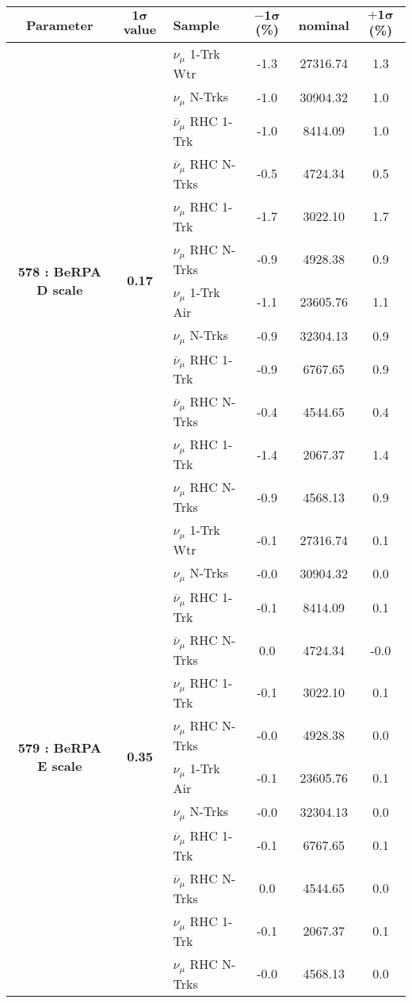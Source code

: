 \addtocounter{table}{-1}
\begin{table}[ht!]
\centering

\begin{tabular}{ c  c  l  c  c  c }
\midrule[1.3pt]
\textbf{Parameter} & \textbf{$\mathbf{1\sigma}$ value} & \textbf{Sample} & \textbf{$\mathbf{-1\sigma}$ (\%)}  &  \textbf{nominal}  &  \textbf{$\mathbf{+1\sigma}$ (\%)} \\
\midrule[1.3pt]
\multirow{12}{*}{\textbf{578 : BeRPA D scale}} & \multirow{12}{*}{\textbf{0.17}} & $\nu_\mu$ 1-Trk Wtr &   -1.3 &  27316.74 &   1.3 \\ 
 &  & $\nu_\mu$ N-Trks &   -1.0 &  30904.32 &   1.0 \\ 
 &  & $\overline{\nu}_\mu$ RHC 1-Trk &   -1.0 &  8414.09 &   1.0 \\ 
 &  & $\overline{\nu}_\mu$ RHC N-Trks &   -0.5 &  4724.34 &   0.5 \\ 
 &  & $\nu_\mu$ RHC 1-Trk &   -1.7 &  3022.10 &   1.7 \\ 
 &  & $\nu_\mu$ RHC N-Trks &   -0.9 &  4928.38 &   0.9 \\ 
 &  & $\nu_\mu$ 1-Trk Air &   -1.1 &  23605.76 &   1.1 \\ 
 &  & $\nu_\mu$ N-Trks &   -0.9 &  32304.13 &   0.9 \\ 
 &  & $\overline{\nu}_\mu$ RHC 1-Trk &   -0.9 &  6767.65 &   0.9 \\ 
 &  & $\overline{\nu}_\mu$ RHC N-Trks &   -0.4 &  4544.65 &   0.4 \\ 
 &  & $\nu_\mu$ RHC 1-Trk &   -1.4 &  2067.37 &   1.4 \\ 
 &  & $\nu_\mu$ RHC N-Trks &   -0.9 &  4568.13 &   0.9 \\ 
\midrule[1.3pt]
\multirow{12}{*}{\textbf{579 : BeRPA E scale}} & \multirow{12}{*}{\textbf{0.35}} & $\nu_\mu$ 1-Trk Wtr &   -0.1 &  27316.74 &   0.1 \\ 
 &  & $\nu_\mu$ N-Trks &   -0.0 &  30904.32 &   0.0 \\ 
 &  & $\overline{\nu}_\mu$ RHC 1-Trk &   -0.1 &  8414.09 &   0.1 \\ 
 &  & $\overline{\nu}_\mu$ RHC N-Trks &   0.0 &  4724.34 &   -0.0 \\ 
 &  & $\nu_\mu$ RHC 1-Trk &   -0.1 &  3022.10 &   0.1 \\ 
 &  & $\nu_\mu$ RHC N-Trks &   -0.0 &  4928.38 &   0.0 \\ 
 &  & $\nu_\mu$ 1-Trk Air &   -0.1 &  23605.76 &   0.1 \\ 
 &  & $\nu_\mu$ N-Trks &   -0.0 &  32304.13 &   0.0 \\ 
 &  & $\overline{\nu}_\mu$ RHC 1-Trk &   -0.1 &  6767.65 &   0.1 \\ 
 &  & $\overline{\nu}_\mu$ RHC N-Trks &   0.0 &  4544.65 &   0.0 \\ 
 &  & $\nu_\mu$ RHC 1-Trk &   -0.1 &  2067.37 &   0.1 \\ 
 &  & $\nu_\mu$ RHC N-Trks &   -0.0 &  4568.13 &   0.0 \\ 
\midrule[1.3pt]
\end{tabular}
\end{table}
